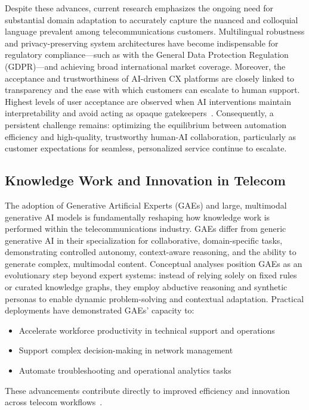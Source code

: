 Despite these advances, current research emphasizes the ongoing need for substantial domain adaptation to accurately capture the nuanced and colloquial language prevalent among telecommunications customers. Multilingual robustness and privacy-preserving system architectures have become indispensable for regulatory compliance—such as with the General Data Protection Regulation (GDPR)—and achieving broad international market coverage. Moreover, the acceptance and trustworthiness of AI-driven CX platforms are closely linked to transparency and the ease with which customers can escalate to human support. Highest levels of user acceptance are observed when AI interventions maintain interpretability and avoid acting as opaque gatekeepers~\cite{ref18}. Consequently, a persistent challenge remains: optimizing the equilibrium between automation efficiency and high-quality, trustworthy human-AI collaboration, particularly as customer expectations for seamless, personalized service continue to escalate.

\subsection{Knowledge Work and Innovation in Telecom}

The adoption of Generative Artificial Experts (GAEs) and large, multimodal generative AI models is fundamentally reshaping how knowledge work is performed within the telecommunications industry. GAEs differ from generic generative AI in their specialization for collaborative, domain-specific tasks, demonstrating controlled autonomy, context-aware reasoning, and the ability to generate complex, multimodal content. Conceptual analyses position GAEs as an evolutionary step beyond expert systems: instead of relying solely on fixed rules or curated knowledge graphs, they employ abductive reasoning and synthetic personas to enable dynamic problem-solving and contextual adaptation. Practical deployments have demonstrated GAEs' capacity to:

\begin{itemize}
    \item Accelerate workforce productivity in technical support and operations
    \item Support complex decision-making in network management
    \item Automate troubleshooting and operational analytics tasks
\end{itemize}

\noindent These advancements contribute directly to improved efficiency and innovation across telecom workflows~\cite{ref2,ref15,ref8,ref18}.

